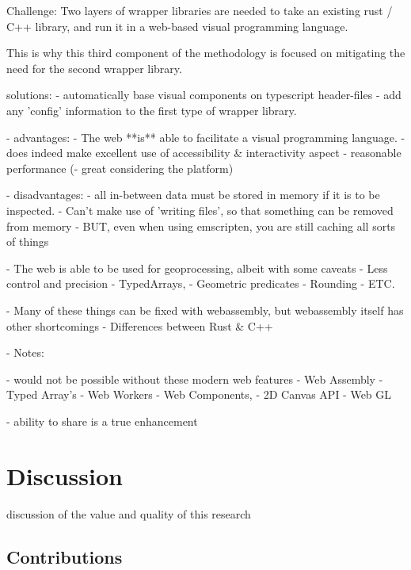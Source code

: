 Challenge:
Two layers of wrapper libraries are needed to take an existing rust / C++ library, and run it in a web-based visual programming language.

This is why this third component of the methodology is focused on mitigating the need for the second wrapper library. 

solutions: 
- automatically base visual components on typescript header-files
- add any 'config' information to the first type of wrapper library. 


- advantages: 
  - The web **is** able to facilitate a visual programming language.
    - does indeed make excellent use of accessibility \& interactivity aspect
  - reasonable performance 
    (- great considering the platform)

- disadvantages: 
  - all in-between data must be stored in memory if it is to be inspected.
    - Can't make use of 'writing files', so that something can be removed from memory 
    - BUT, even when using emscripten, you are still caching all sorts of things

  - The web is able to be used for geoprocessing, albeit with some caveats
    - Less control and precision
    - TypedArrays,
    - Geometric predicates 
    - Rounding
    - ETC.

  - Many of these things can be fixed with webassembly, but webassembly itself has other shortcomings
    - Differences between Rust \& C++

 - Notes:

   - would not be possible without these modern web features
    - Web Assembly 
    - Typed Array's 
    - Web Workers
    - Web Components,
    - 2D Canvas API
    - Web GL

- ability to share is a true enhancement







\section{Discussion}
\label{sec:discussion}

discussion of the value and quality of this research


\subsection{Contributions}
\label{sec:contribution}

